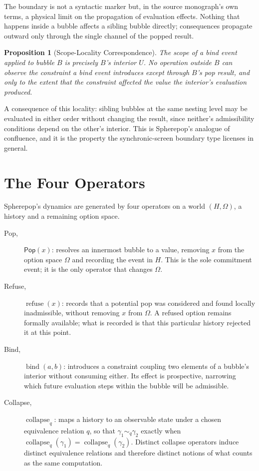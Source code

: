 \documentclass[11pt,fleqn]{book}
\numberwithin{equation}{chapter}
\theoremstyle{plain}
\newtheorem{proposition}[theorem]{Proposition}
\theoremstyle{definition}
\theoremstyle{remark}
\providecommand{\scollapse}[1]{\operatorname{collapse}_{#1}}
\providecommand{\srefuse}[1]{\operatorname{refuse}(#1)}
\providecommand{\sbind}[2]{\operatorname{bind}(#1,#2)}
\providecommand{\Pop}{\mathsf{Pop}}
\begin{document}
The boundary is not a syntactic marker but, in the source monograph's own terms, a physical limit on the propagation of evaluation effects. Nothing that happens inside a bubble affects a sibling bubble directly; consequences propagate outward only through the single channel of the popped result.

\begin{proposition}[Scope-Locality Correspondence]
The scope of a bind event applied to bubble \(B\) is precisely \(B\)'s interior \(U\). No operation outside \(B\) can observe the constraint a bind event introduces except through \(B\)'s pop result, and only to the extent that the constraint affected the value the interior's evaluation produced.
\end{proposition}

A consequence of this locality: sibling bubbles at the same nesting level may be evaluated in either order without changing the result, since neither's admissibility conditions depend on the other's interior. This is Spherepop's analogue of confluence, and it is the property the synchronic-screen boundary type licenses in general.

\section{The Four Operators}

Spherepop's dynamics are generated by four operators on a world \((H,\Omega)\), a history and a remaining option space.

\begin{description}
\item[Pop,] \(\Pop(x)\): resolves an innermost bubble to a value, removing \(x\) from the option space \(\Omega\) and recording the event in \(H\). This is the sole commitment event; it is the only operator that changes \(\Omega\).
\item[Refuse,] \(\srefuse{x}\): records that a potential pop was considered and found locally inadmissible, without removing \(x\) from \(\Omega\). A refused option remains formally available; what is recorded is that this particular history rejected it at this point.
\item[Bind,] \(\sbind{a}{b}\): introduces a constraint coupling two elements of a bubble's interior without consuming either. Its effect is prospective, narrowing which future evaluation steps within the bubble will be admissible.
\item[Collapse,] \(\scollapse{q}\): maps a history to an observable state under a chosen equivalence relation \(q\), so that \(\gamma_1\sim_q\gamma_2\) exactly when \(\scollapse{q}(\gamma_1)=\scollapse{q}(\gamma_2)\). Distinct collapse operators induce distinct equivalence relations and therefore distinct notions of what counts as the same computation.
\end{description}
\end{document}
